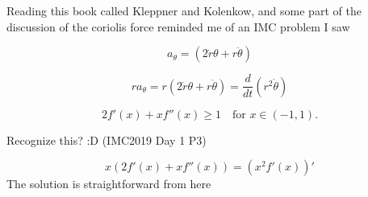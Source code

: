 \documentclass[11]{article}
\title{\sc{Misc. Note}}
\author{\sc{Rahul}}
\date{\today}
\begin{document}
\maketitle

Reading this book called Kleppner and Kolenkow, and some part of the discussion of the coriolis force reminded me of an IMC problem I saw

$$a_\theta = (2 \dot r \theta + r \ddot \theta)$$

$$ra_\theta = r(2 \dot r \theta + r \ddot \theta) = \frac{d}{dt} (r^2 \dot \theta)$$

$$\displaystyle  {2f'(x)+xf''(x)\geq1} \quad\text{for \(\displaystyle x\in(-1,1)\)}.$$

Recognize this? :D (IMC2019 Day 1 P3)

$$x(2f'(x)+xf''(x)) = (x^2f'(x))' $$
The solution is straightforward from here
\end{document}
